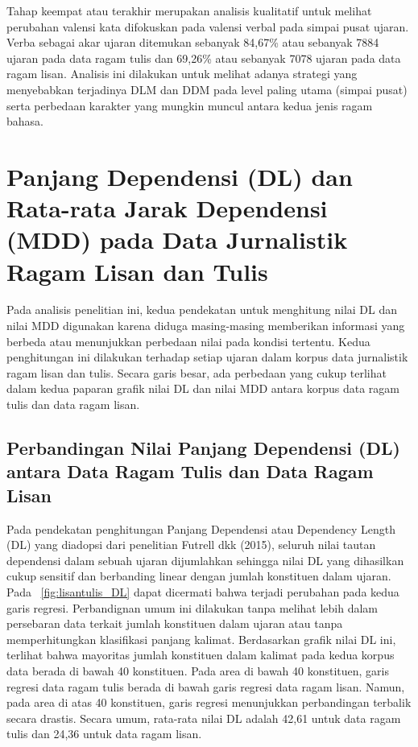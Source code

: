Tahap keempat atau terakhir merupakan analisis kualitatif untuk melihat perubahan valensi kata difokuskan pada valensi verbal pada simpai pusat ujaran. Verba sebagai akar ujaran ditemukan sebanyak 84,67\% atau sebanyak 7884 ujaran pada data ragam tulis dan 69,26\% atau sebanyak 7078 ujaran pada data ragam lisan. Analisis ini dilakukan untuk melihat adanya strategi yang menyebabkan terjadinya DLM dan DDM pada level paling utama (simpai pusat) serta perbedaan karakter yang mungkin muncul antara kedua jenis ragam bahasa.

\section{Panjang Dependensi (DL) dan Rata-rata Jarak Dependensi (MDD) pada Data Jurnalistik Ragam Lisan dan Tulis}
Pada analisis penelitian ini, kedua pendekatan untuk menghitung nilai DL dan nilai MDD digunakan karena diduga masing-masing memberikan informasi yang berbeda atau menunjukkan perbedaan nilai pada kondisi tertentu. Kedua penghitungan ini dilakukan terhadap setiap ujaran dalam korpus data jurnalistik ragam lisan dan tulis. Secara garis besar, ada perbedaan yang cukup terlihat dalam kedua paparan grafik nilai DL dan nilai MDD antara korpus data ragam tulis dan data ragam lisan.

\subsection{Perbandingan Nilai Panjang Dependensi (DL) antara Data Ragam Tulis dan Data Ragam Lisan}
Pada pendekatan penghitungan Panjang Dependensi atau Dependency Length (DL) yang diadopsi dari penelitian Futrell dkk (2015), seluruh nilai tautan dependensi dalam sebuah ujaran dijumlahkan sehingga nilai DL yang dihasilkan cukup sensitif dan berbanding linear dengan jumlah konstituen dalam ujaran. Pada \pic~\ref{fig:lisantulis_DL} dapat dicermati bahwa terjadi perubahan pada kedua garis regresi. Perbandignan umum ini dilakukan tanpa melihat lebih dalam persebaran data terkait jumlah konstituen dalam ujaran atau tanpa memperhitungkan klasifikasi panjang kalimat. Berdasarkan grafik nilai DL ini, terlihat bahwa mayoritas jumlah konstituen dalam kalimat pada kedua korpus data berada di bawah 40 konstituen. Pada area di bawah 40 konstituen, garis regresi data ragam tulis berada di bawah garis regresi data ragam lisan. Namun, pada area di atas 40 konstituen, garis regresi menunjukkan perbandingan terbalik secara drastis. Secara umum, rata-rata nilai DL adalah 42,61 untuk data ragam tulis dan 24,36 untuk data ragam lisan. 

